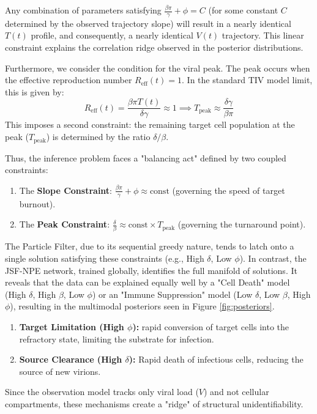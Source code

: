 \documentclass{article}
\begin{document}
Any combination of parameters satisfying $\frac{\beta \pi}{\gamma} + \phi = C$ (for some constant $C$ determined by the observed trajectory slope) will result in a nearly identical $T(t)$ profile, and consequently, a nearly identical $V(t)$ trajectory. This linear constraint explains the correlation ridge observed in the posterior distributions.

Furthermore, we consider the condition for the viral peak. The peak occurs when the effective reproduction number $R_{\text{eff}}(t) = 1$. In the standard TIV model limit, this is given by:
\begin{equation}
    R_{\text{eff}}(t) = \frac{\beta \pi T(t)}{\delta \gamma} \approx 1 \implies T_{\text{peak}} \approx \frac{\delta \gamma}{\beta \pi}
\end{equation}
This imposes a second constraint: the remaining target cell population at the peak ($T_{\text{peak}}$) is determined by the ratio $\delta / \beta$.

Thus, the inference problem faces a "balancing act" defined by two coupled constraints:
\begin{enumerate}
    \item The \textbf{Slope Constraint}: $\frac{\beta \pi}{\gamma} + \phi \approx \text{const}$ (governing the speed of target burnout).
    \item The \textbf{Peak Constraint}: $\frac{\delta}{\beta} \approx \text{const} \times T_{\text{peak}}$ (governing the turnaround point).
\end{enumerate}

The Particle Filter, due to its sequential greedy nature, tends to latch onto a single solution satisfying these constraints (e.g., High $\delta$, Low $\phi$). In contrast, the JSF-NPE network, trained globally, identifies the full manifold of solutions. It reveals that the data can be explained equally well by a "Cell Death" model (High $\delta$, High $\beta$, Low $\phi$) or an "Immune Suppression" model (Low $\delta$, Low $\beta$, High $\phi$), resulting in the multimodal posteriors seen in Figure \ref{fig:posteriors}.


\begin{enumerate}
    \item \textbf{Target Limitation (High $\phi$):} rapid conversion of target cells into the refractory state, limiting the substrate for infection.
    \item \textbf{Source Clearance (High $\delta$):} Rapid death of infectious cells, reducing the source of new virions.
\end{enumerate}
Since the observation model tracks only viral load ($V$) and not cellular compartments, these mechanisms create a "ridge" of structural unidentifiability. 
\end{document}
